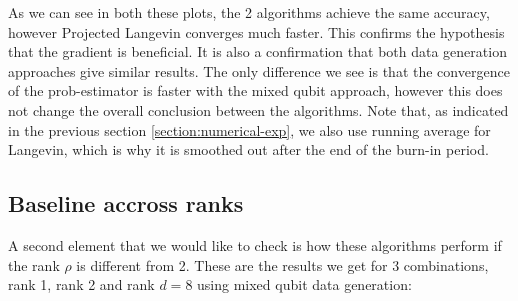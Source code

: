 \documentclass[12pt]{memoir}
\begin{document}
As we can see in both these plots, the 2 algorithms achieve the same accuracy, however Projected Langevin converges much faster. This confirms the hypothesis that the gradient is beneficial. It is also a confirmation that both data generation approaches give similar results. The only difference we see is that the convergence of the prob-estimator is faster with the mixed qubit approach, however this does not change the overall conclusion between the algorithms. Note that, as indicated in the previous section \ref{section:numerical-exp}, we also use running average for Langevin, which is why it is smoothed out after the end of the burn-in period.

\subsection*{Baseline accross ranks}
A second element that we would like to check is how these algorithms perform if the rank $\rho$ is different from 2. These are the results we get for 3 combinations, rank 1, rank 2 and rank $d=8$ using mixed qubit data generation:
\end{document}
